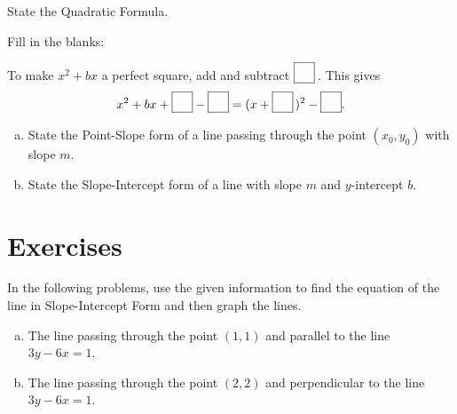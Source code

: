 \documentclass[12pt]{amsart}
\begin{document}
\begin{thm}[1 Points]\label{ex3}
  State the Quadratic Formula.
  \vspace{1in}
\end{thm}

\begin{thm}[1 Points]\label{ex4}
  Fill in the blanks:\\
  \begin{center}
    To make $x^2 + bx$ a perfect square, add and subtract $\fbox{\raisebox{10px}{\hspace{10px}}}$\,.
    This gives
    $$x^2 + bx + \fbox{\raisebox{10px}{\hspace{10px}}} - \fbox{\raisebox{10px}{\hspace{10px}}} = (x + \fbox{\raisebox{10px}{\hspace{10px}}}\,)^2 - \fbox{\raisebox{10px}{\hspace{10px}}}.$$
  \end{center}
\end{thm}

\begin{thm}[2 Points]\label{ex1}
  \begin{enumerate}[(a)]
  \item
    State the Point-Slope form of a line passing through the point $(x_0, y_0)$ with slope $m$.
    \vspace{1in}
  \item
    State the Slope-Intercept form of a line with slope $m$ and $y$-intercept $b$.
    \vspace{1in}
  \end{enumerate}
\end{thm}
\newpage
\section{Exercises}

\begin{thm}[18 Points]\label{ex5}
  In the following problems, use the given information to find the equation of the line in Slope-Intercept Form and then graph the lines.
  \begin{enumerate}[(a)]
  \item
    The line passing through the point $(1,1)$ and parallel to the line $3y - 6x = 1$.
    \vspace{3in}
  \item
    The line passing through the  point $(2,2)$ and perpendicular to the line $3y - 6x = 1$.
    \vspace{2in}
  \end{enumerate}
  \vspace{1in}
\end{thm}
\end{document}
